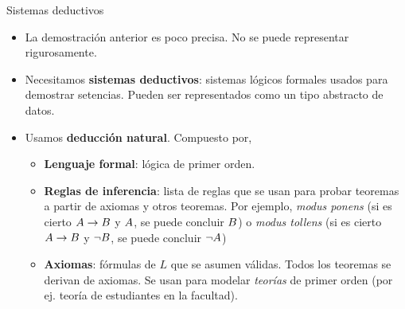 \documentclass[xcolor={dvipsnames},spanish]{beamer}
\begin{document}
\begin{frame}{Sistemas deductivos}
    \begin{itemize}
        \item La demostración anterior es poco precisa. No se puede representar rigurosamente.
        \item Necesitamos \textbf{sistemas deductivos}: sistemas lógicos formales usados para demostrar setencias. Pueden ser representados como un tipo abstracto de datos.
        \item Usamos \textbf{deducción natural}. Compuesto por,
        \begin{itemize}
            \item \textbf{Lenguaje formal}: lógica de primer orden.
            \item \textbf{Reglas de inferencia}: lista de reglas que se usan para probar teoremas a partir de axiomas y otros teoremas. Por ejemplo, \textit{modus ponens} (si
    es cierto $A \to B$ y $A$, se puede concluir $B$) o
    \textit{modus tollens} (si es cierto $A \to B$ y $\neg
    B$, se puede concluir $\neg A$)
    \item \textbf{Axiomas}: fórmulas de $L$ que se asumen válidas. Todos los
    teoremas se derivan de axiomas. Se usan para modelar \textit{teorías} de
    primer orden (por ej. teoría de estudiantes en la facultad).
        \end{itemize}
    \end{itemize}
\end{frame}
\end{document}
